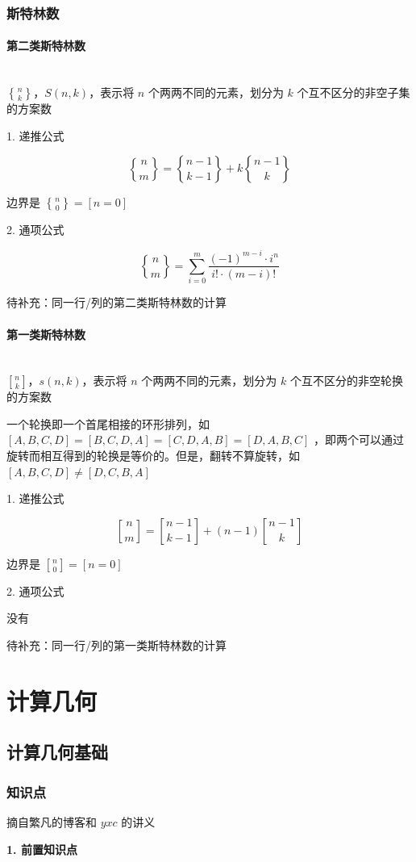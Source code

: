 \documentclass[12pt]{article}
\newcommand{\subsubsubsection}[1]{\paragraph{#1}\mbox{}\\}
\begin{document}
\newpage

\subsubsection{斯特林数}

\subsubsubsection{第二类斯特林数}

$n\brace k$，$S(n,k)$，表示将 $n$ 个两两不同的元素，划分为 $k$ 个互不区分的非空子集的方案数

1. 递推公式

$$
{n\brace m}={n-1\brace k-1}+k{n-1\brace k}
$$

边界是 ${n\brace 0}=[n=0]$

2. 通项公式

$$
{n\brace m}=\sum_{i=0}^{m}\frac{(-1)^{m-i}\cdot i^n}{i!\cdot(m-i)!}
$$

待补充：同一行/列的第二类斯特林数的计算

\subsubsubsection{第一类斯特林数}

$n\brack k$，$s(n,k)$，表示将 $n$ 个两两不同的元素，划分为 $k$ 个互不区分的非空轮换的方案数

一个轮换即一个首尾相接的环形排列，如 $[A,B,C,D]=[B,C,D,A]=[C,D,A,B]=[D,A,B,C]$ ，即两个可以通过旋转而相互得到的轮换是等价的。但是，翻转不算旋转，如 $[A,B,C,D]\ne[D,C,B,A]$

1. 递推公式

$$
{n\brack m}={n-1\brack k-1}+(n-1){n-1\brack k}
$$

边界是 ${n\brack 0}=[n=0]$

2. 通项公式

\centerline{没有}

待补充：同一行/列的第一类斯特林数的计算

\newpage

{\centering\section{计算几何}}

\subsection{计算几何基础}

\subsubsection{知识点} %

摘自繁凡的博客和 $yxc$ 的讲义

\textbf{1. 前置知识点}
\end{document}
